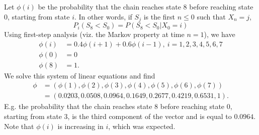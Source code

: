 \begin{enumerate}[label=\alph*)]
\begin{solution}[8cm]
Let $\phi(i)$ be the probability that the chain reaches state 8 before 
reaching state 0, starting from state $i$. In other words, if $S_j$ is 
the first $n \leq 0$ such that $X_n = j$, 
\begin{equation}
P_i(S_8 < S_0) = P(S_8 < S_0|X_0 = i)
\end{equation}
Using first-step analysis (viz. the Markov property at time $n = 1$), 
we have 
\begin{align*}
\phi(i) &= 0.4 \phi(i + 1) + 0.6 \phi(i - 1),\ i = 1, 2,3,4,5,6,7 \\
\phi(0) &= 0 \\
\phi(8) &= 1.
\end{align*}
We solve this system of linear equations and find
\begin{align*}
\phi &= (\phi(1), \phi(2), \phi(3), \phi(4), \phi(5), \phi(6), \phi(7)) \\
&= (0.0203, 0.0508, 0.0964, 0.1649, 0.2677, 0.4219, 0.6531, 1).
\end{align*}
E.g. the probability that the chain reaches state 8 before reaching 
state 0, starting from state 3, is the third component of the vector 
and is equal to $0.0964$. Note that $\phi(i)$ is increasing in $i$, 
which was expected.
\end{solution}


\end{enumerate}
